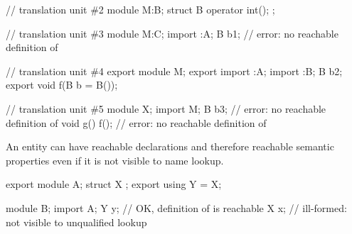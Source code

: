 \begin{std.txt}
\begin{example}
\begin{codeblock}
// translation unit \#2
module M:B;
struct B {
  operator int();
};

// translation unit \#3
module M:C;
import :A;
B b1;                     // error: no reachable definition of 

// translation unit \#4
export module M;
export import :A;
import :B;
B b2;
export void f(B b = B());

// translation unit \#5
module X;
import M;
B b3;                     // error: no reachable definition of 
void g() { f(); }         // error: no reachable definition of 
\end{codeblock}
\end{example}
\exitnote


\pnum
\enternote
An entity can have reachable declarations and therefore
reachable semantic properties even if it is not visible
to name lookup.
\exitnote
\begin{example}
\begin{codeblock}
export module A;
struct X {};
export using Y = X;

module B;
import A;
Y y;            // OK, definition of  is reachable
X x;            // ill-formed:  not visible to unqualified lookup
\end{codeblock}
\end{example}
\end{std.txt}
